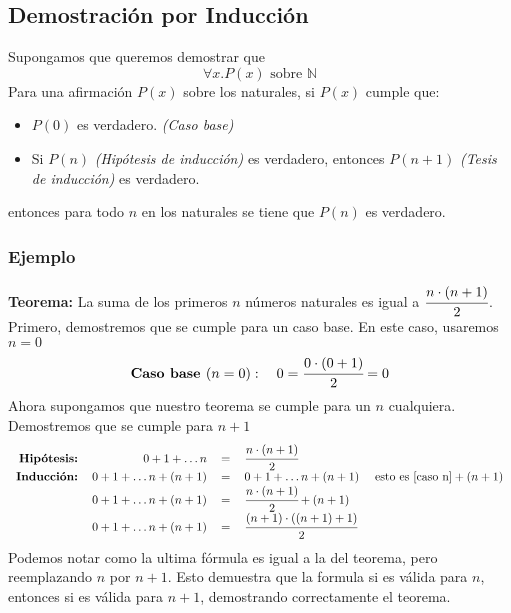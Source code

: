\documentclass[../main.tex]{subfiles}
\begin{document}
\subsection{Demostración por Inducción}
Supongamos que queremos demostrar que
\[ \forall x . P(x) \text{ sobre } \mathds{N} \]
Para una afirmación $P(x)$ sobre los naturales, si $P(x)$ cumple que:
\begin{itemize}
    \item $P(0)$ es verdadero. \textit{(Caso base)}
    \item Si $P(n)$ \textit{(Hipótesis de inducción)} es verdadero, entonces $P(n + 1)$ \textit{(Tesis de inducción)} es verdadero.
\end{itemize}
entonces para todo $n$ en los naturales se tiene que $P(n)$ es verdadero.

\subsubsection*{Ejemplo}
\textbf{Teorema:} La suma de los primeros $n$ números naturales es igual a $\cfrac{n \cdot (n + 1)}{2}$.\\
Primero, demostremos que se cumple para un caso base. En este caso, usaremos $n = 0$
\[ \textbf{Caso base } (n = 0) : \quad 0 = \cfrac{0 \cdot (0 + 1)}{2} = 0 \]
Ahora supongamos que nuestro teorema se cumple para un $n$ cualquiera. Demostremos que se cumple para $n + 1$
\[
    \begin{tabular}{rrcl}
        \textbf{Hipótesis:} & $0 + 1 + \ldots n$ & $=$ & $\cfrac{n \cdot (n + 1)}{2}$ \\
        \textbf{Inducción:} & $0 + 1 + \ldots n + (n + 1)$ & $=$ & $0 + 1 + \ldots n + (n + 1) \quad$ esto es $\text{[caso n]} + (n + 1)$\\
        \space & $0 + 1 + \ldots n + (n + 1)$ & $=$ & $\cfrac{n \cdot (n + 1)}{2} + (n + 1)$\\
        \space & $0 + 1 + \ldots n + (n + 1)$ & $=$ & $\cfrac{(n + 1) \cdot ((n + 1) + 1)}{2}$\\
    \end{tabular}
\]
Podemos notar como la ultima fórmula es igual a la del teorema, pero reemplazando $n$ por $n + 1$. Esto demuestra que la formula si es válida para $n$, entonces si es válida para $n + 1$, demostrando correctamente el teorema.
\end{document}
